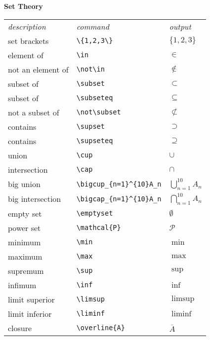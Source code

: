 \documentclass[10pt,landscape]{article}
\newcommand{\ColorSubsection}[1]{\par\vspace{1ex}\noindent\textcolor{subsectioncolor}{\normalsize\bfseries #1}\par\vspace{0.5ex}}
\begin{document}
\begin{multicols}{3}
\ColorSubsection{Set Theory}
\begin{tabular}{lll}
\emph{description} & \emph{command} & \emph{output}\\
set brackets & \verb!\{1,2,3\}! & \(\{1,2,3\}\)\\
element of & \verb!\in! & \(\in\)\\
not an element of & \verb!\not\in! & \(\not\in\)\\
subset of & \verb!\subset! & \(\subset\)\\
subset of & \verb!\subseteq! & \(\subseteq\)\\
not a subset of & \verb!\not\subset! & \(\not\subset\)\\
contains & \verb!\supset! & \(\supset\)\\
contains & \verb!\supseteq! & \(\supseteq\)\\
union & \verb!\cup! & \(\cup\)\\
intersection & \verb!\cap! & \(\cap\)\\
big union & 
\verb!\bigcup_{n=1}^{10}A_n! &
\(\displaystyle \bigcup_{n=1}^{10}A_{n}\)\\
big intersection & \verb!\bigcap_{n=1}^{10}A_n! &\(\displaystyle \bigcap_{n=1}^{10}A_{n}\)\\
empty set & \verb!\emptyset! & \(\emptyset\)\\
power set & \verb!\mathcal{P}! & \(\mathcal{P}\)\\
minimum & \verb!\min! & \(\min\)\\
maximum & \verb!\max! & \(\max\)\\
supremum & \verb!\sup! & \(\sup\)\\
infimum & \verb!\inf! & \(\inf\)\\
limit superior & \verb!\limsup! & \(\limsup\)\\
limit inferior & \verb!\liminf! & \(\liminf\)\\
closure & \verb!\overline{A}! & \(\overline{A}\)
\end{tabular}


\end{multicols}
\end{document}
